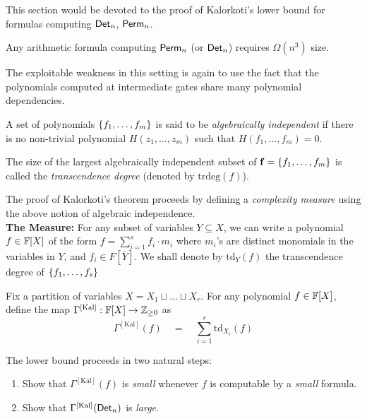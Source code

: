 \documentclass{birkjour}
\newcommand{\CM}[1]{\Gamma^{\mathrm{[#1]}}}
\providecommand{\DIFaddtex}[1]{{\protect\color{blue}\uwave{#1}}} %
\providecommand{\DIFdeltex}[1]{{\protect\color{red}\sout{#1}}}                      %
\providecommand{\DIFaddbegin}{} %
\providecommand{\DIFaddend}{} %
\providecommand{\DIFdelbegin}{} %
\providecommand{\DIFdelend}{} %
\providecommand{\DIFadd}[1]{\texorpdfstring{\DIFaddtex{#1}}{#1}} %
\providecommand{\DIFdel}[1]{\texorpdfstring{\DIFdeltex{#1}}{}} %
\begin{document}
This section would be devoted to the proof of Kalorkoti's lower bound
\cite{k85} for formulas computing $\mathsf{Det}_n$, $\mathsf{Perm}_n$.

\begin{theorem}[\cite{k85}]\label{thm:kalorkoti}
  Any arithmetic formula computing $\mathsf{Perm}_n$ (or $\mathsf{Det}_n$) requires
  $\Omega(n^3)$ size.
\end{theorem}

The exploitable weakness in this setting is again to use the fact that the polynomials computed at intermediate gates share many polynomial dependencies. 

\begin{definition}
  A set of polynomials $\left\{f_1,\dots, f_m\right\}$ is said to be
  \emph{algebraically independent} if there is no non-trivial polynomial 
  $H(z_1,\dots, z_m)$ such that $H(f_1,\dots, f_m)=0$. 

  The size of the largest algebraically independent subset of
  $\mathbf{f}=\left\{f_1,\dots, f_m\right\}$ is called the \emph{transcendence
    degree} (denoted by $\mathrm{trdeg}(f)$).
\end{definition}

The proof of Kalorkoti's theorem proceeds by defining a \emph{complexity measure} using the above notion of algebraic independence. \\


{\bf The Measure:} 
For any subset of variables $Y\subseteq X$, we can write a polynomial
$f \in \mathbb{F}[X]$ of the form $f = \sum_{i=1}^s f_i \cdot m_i$ where $m_i$'s are
distinct monomials in the variables in $Y$, and \DIFdelbegin \DIFdel{$f_i \in
F[\overline{Y}]$}\DIFdelend \DIFaddbegin \DIFadd{$f_i \in
F[X \setminus Y]$}\DIFaddend . We shall denote by $\mathrm{td}_Y(f)$ the transcendence degree of $\left\{f_1,\dots, f_s\right\}$


Fix a partition of variables $X = X_1 \sqcup \dots
\sqcup X_r$. For any polynomial $f\in \mathbb{F}[X]$, define the map $\CM{Kal}:\F[X]\rightarrow \Z_{\geq 0}$  as
$$
\CM{Kal}(f) \quad=\quad \sum_{i=1}^r \mathrm{td}_{X_i}(f)
$$

The lower bound proceeds in two natural steps:
\begin{enumerate}
\item Show that $\CM{Kal}(f)$ is \emph{small} whenever $f$ is computable by a \emph{small} formula. 
\item Show that $\CM{Kal}(\Det_n)$ is \emph{large}. 
\end{enumerate}
\end{document}
